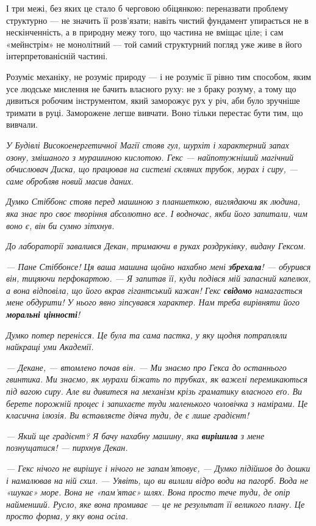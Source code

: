 \documentclass[12pt, a4paper, openany]{book}
\begin{document}
І три межі, без яких це стало б черговою обіцянкою: переназвати проблему структурно --- не значить її розв'язати; навіть чистий фундамент упирається не в нескінченність, а в природну межу того, що частина не вміщає ціле; і сам «мейнстрім» не монолітний --- той самий структурний погляд уже живе в його інтерпретованісній частині.

Розуміє механіку, не розуміє природу --- і не розуміє її рівно тим способом, яким усе людське мислення не бачить власного руху: не з браку розуму, а тому що дивиться робочим інструментом, який заморожує рух у річ, аби було зручніше тримати в руці. Заморожене легше вивчати. Воно тільки перестає бути тим, що вивчали.

\begin{terrybox}
\textit{У Будівлі Високоенергетичної Магії стояв гул, шурхіт і характерний запах озону, змішаного з мурашиною кислотою. Гекс --- найпотужніший магічний обчислювач Диска, що працював на системі скляних трубок, мурах і сиру, --- саме обробляв новий масив даних.}

\textit{Думко Стіббонс стояв перед машиною з планшеткою, виглядаючи як людина, яка знає про своє творіння абсолютно все. І водночас, якби його запитали, \emph{чим} воно є, він би сумно зітхнув.}

\textit{До лабораторії завалився Декан, тримаючи в руках роздруківку, видану Гексом.}

\textit{--- Пане Стіббонсе! Ця ваша машина щойно нахабно мені \textbf{збрехала}! --- обурився він, тицяючи перфокартою. --- Я запитав її, куди подівся мій запасний капелюх, а вона відповіла, що його вкрав гігантський кажан! Гекс \textbf{свідомо} намагається мене обдурити! У нього явно зіпсувався характер. Нам треба вирівняти його \textbf{моральні цінності}!}

\textit{Думко потер перенісся. Це була та сама пастка, у яку щодня потрапляли найкращі уми Академії.}

\textit{--- Декане, --- втомлено почав він. --- Ми знаємо про Гекса до останнього гвинтика. Ми знаємо, як мурахи біжать по трубках, як важелі перемикаються під вагою сиру. Але ви дивитеся на механізм крізь граматику власного еґо. Ви берете порожній процес і запихаєте туди маленького чоловічка з намірами. Це класична ілюзія. Ви вставляєте діяча туди, де є лише градієнт!}

\textit{--- Який ще градієнт? Я бачу нахабну машину, яка \textbf{вирішила} з мене познущатися! --- пирхнув Декан.}

\textit{--- Гекс нічого не \emph{вирішує} і нічого не \emph{запам'ятовує}, --- Думко підійшов до дошки і намалював на ній схил. --- Уявіть, що ви вилили відро води на пагорб. Вода не «шукає» море. Вона не «пам'ятає» шлях. Вона просто тече туди, де опір найменший. Русло, яке вона промиває --- це не результат її великого плану. Це просто форма, у яку вона осіла.}


\end{terrybox}
\end{document}
